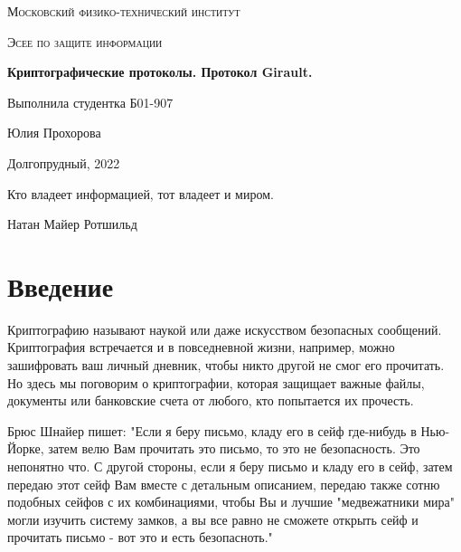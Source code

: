 \documentclass[a4paper]{article}
\begin{document}
\newcommand{\apple}{\char"F8FF}



\begin{titlepage}
    \vspace*{4cm}
	\centering
    {\scshape\LARGE Московский физико-технический институт\par}
	\vspace{1cm}
	{\scshape\Large Эсее по защите информации\par}
	\vspace{1cm}
    {\huge\bfseries  Криптографические протоколы. Протокол Girault.\par}
	\vspace{2cm}
	\vfill
\begin{flushright}
	{\large Выполнила студентка Б01-907}\par
	\vspace{0.3cm}
	{\LARGE Юлия Прохорова}
\end{flushright}
	
	\vfill
Долгопрудный, 2022
\end{titlepage}

\pagestyle{fancy} 
\fancyhead[C]{}
\fancyfoot[C]{ \noindent\rule{\textwidth}{0.4pt} \thepage }

\tableofcontents

\newpage

\epigraph{Кто владеет информацией, тот владеет и миром.}{Натан Майер Ротшильд}

\section{Введение}
Криптографию называют наукой или даже искусством безопасных сообщений. Криптография встречается и в повседневной жизни, например, можно зашифровать ваш личный дневник, чтобы никто другой не смог его прочитать. Но здесь мы поговорим о криптографии, которая защищает важные файлы, документы или банковские счета от любого, кто попытается их прочесть.
  \par
  \begin{displayquote}
    Брюс Шнайер пишет: "Если я беру письмо, кладу его в сейф где-нибудь в Нью-Йорке, затем велю Вам прочитать это письмо, то это не безопасность. Это непонятно что. С другой стороны,
  если я беру письмо и кладу его в сейф, затем передаю этот сейф Вам вместе с детальным описанием, передаю также сотню подобных сейфов
  с их комбинациями, чтобы Вы и лучшие "медвежатники мира" могли изучить систему замков, а вы все равно не сможете открыть сейф 
  и прочитать письмо - вот это и есть безопасноть." 
 \end{displayquote}
 
\end{document}
